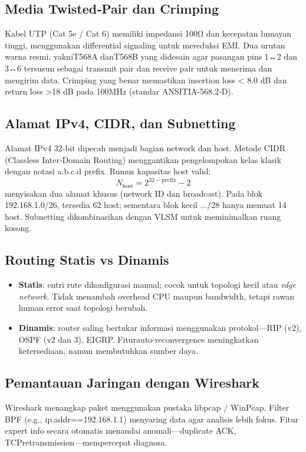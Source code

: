 \subsection{Media Twisted‑Pair dan Crimping}
Kabel UTP (Cat 5e / Cat 6) memiliki impedansi 100Ω dan kecepatan lumayan tinggi, menggunakan differential signaling untuk mereduksi EMI. Dua urutan warna resmi, yakniT568A danT568B yang didesain agar pasangan pins 1↔2 dan 3↔6 tersusun sebagai transmit pair dan receive pair untuk menerima dan mengirim data. Crimping yang benar memastikan insertion loss < 8.0 dB dan return loss >18 dB pada 100MHz (standar ANSITIA‑568.2‑D).

\subsection{Alamat IPv4, CIDR, dan Subnetting}
Alamat IPv4 32‑bit dipecah menjadi bagian network dan host. Metode CIDR (Classless Inter‑Domain Routing) menggantikan pengelompokan kelas klasik dengan notasi a.b.c.d prefix. Rumus kapasitas host valid:
\[N_\text{host}=2^{32-\text{prefix}}-2\]
menyisakan dua alamat khusus (network ID dan broadcast). Pada blok 192.168.1.0/26, tersedia 62 host; sementara blok kecil .../28 hanya memuat 14 host. Subnetting dikombinasikan dengan VLSM untuk meminimalkan ruang kosong.

\subsection{Routing Statis vs Dinamis}
\begin{itemize}
  \item \textbf{Statis}: entri rute dikonfigurasi manual; cocok untuk topologi kecil atau \emph{edge network}. Tidak menambah overhead CPU maupun bandwidth, tetapi rawan human error saat topologi berubah.
  \item \textbf{Dinamis}: router saling bertukar informasi menggunakan protokol—RIP (v2), OSPF (v2 dan 3), EIGRP. Fiturauto‑reconvergence meningkatkan ketersediaan, namun membutuhkan sumber daya.
\end{itemize}

\subsection{Pemantauan Jaringan dengan Wireshark}
Wireshark menangkap paket menggunakan pustaka libpcap / WinPcap. Filter BPF (e.g., ip.addr==192.168.1.1) menyaring data agar analisis lebih fokus. Fitur expert info secara otomatis menandai anomali—duplicate ACK, TCPretransmission—mempercepat diagnosa.

